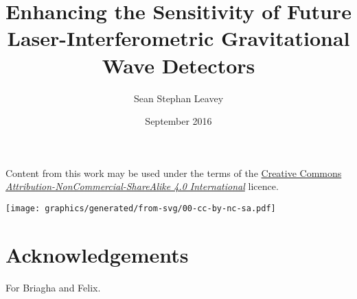\documentclass[twoside,hidelinks]{glasgowthesis}
\begin{document}

\title{Enhancing the Sensitivity of Future Laser-Interferometric Gravitational Wave Detectors}
\author{Sean Stephan Leavey}
\date{September 2016}

\maketitle

\cleardoublepage


 

\newpage




\newpage
{}
\vspace*{8in}
\noindent Content from this work may be used under the terms of the \href{https://creativecommons.org/licenses/by-nc-sa/4.0/}{Creative Commons \emph{Attribution-NonCommercial-ShareAlike 4.0 International}} licence.
\begin{center}
  \texttt{[image: graphics/generated/from-svg/00-cc-by-nc-sa.pdf]}
\end{center}

\newpage
\renewcommand{\contentsname}{Table of contents}
\tableofcontents
{}

\listoftables
{}

\listoffigures
{}

\cleardoublepage
\section*{\label{c:intro:credits}Acknowledgements}


\cleardoublepage
{}
\chaptermark{}
\begin{preface}
\begin{flushright} For Briagha and Felix.\end{flushright}
\end{preface}
\end{document}
